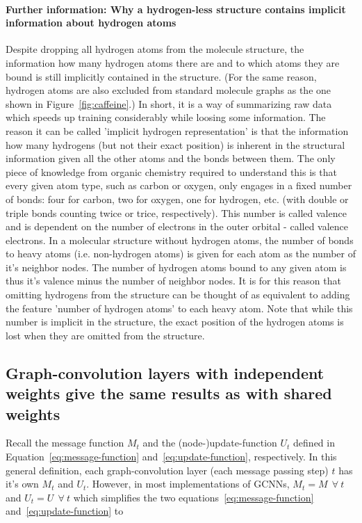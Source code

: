 \paragraph{Further information: Why a hydrogen-less structure contains implicit information about hydrogen atoms}
Despite dropping all hydrogen atoms from the molecule structure, the information how many hydrogen atoms there are and to which atoms they are bound is still implicitly contained in the structure. (For the same reason, hydrogen atoms are also excluded from standard molecule graphs as the one shown in Figure~\ref{fig:caffeine}.) In short, it is a way of summarizing raw data which speeds up training considerably while loosing some information. The reason it can be called 'implicit hydrogen representation' is that the information how many hydrogens (but not their exact position) is inherent in the structural information given all the other atoms and the bonds between them. The only piece of knowledge from organic chemistry required to understand this is that every given atom type, such as carbon or oxygen, only engages in a fixed number of bonds: four for carbon, two for oxygen, one for hydrogen, etc. (with double or triple bonds counting twice or trice, respectively). This number is called valence and is dependent on the number of electrons in the outer orbital - called valence electrons. In a molecular structure without hydrogen atoms, the number of bonds to heavy atoms (i.e. non-hydrogen atoms) is given for each atom as the number of it's neighbor nodes. The number of hydrogen atoms bound to any given atom is thus it's valence minus the number of neighbor nodes. It is for this reason that omitting hydrogens from the structure can be thought of as equivalent to adding the feature 'number of hydrogen atoms' to each heavy atom. Note that while this number is implicit in the structure, the exact position of the hydrogen atoms is lost when they are omitted from the structure.



\subsection{Graph-convolution layers with independent weights give the same results as with shared weights}
\label{sec:weight-sharing}

Recall the message function $M_t$ and the (node-)update-function $U_t$ defined in Equation~\ref{eq:message-function} and~\ref{eq:update-function}, respectively. In this general definition, each graph-convolution layer (each message passing step) $t$ has it's own $M_t$ and $U_t$. However, in most implementations of GCNNs, $M_t = M~~\forall~t$ and $U_t = U~~\forall~t$ which simplifies the two equations~\ref{eq:message-function} and~\ref{eq:update-function} to


